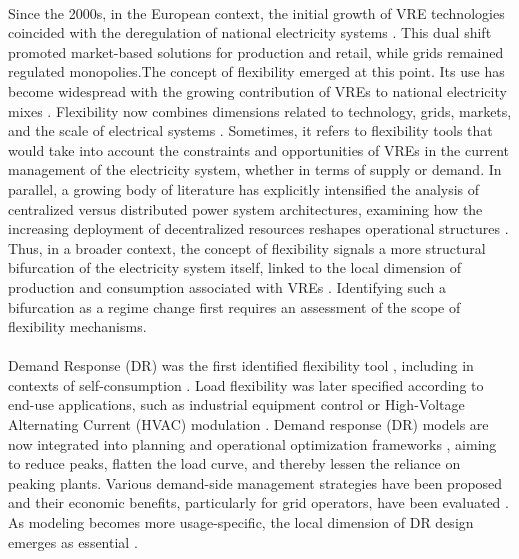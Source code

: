 \documentclass[12pt]{article}
\begin{document}
\paragraph{}
Since the 2000s, in the European context, the initial growth of VRE technologies coincided with the deregulation of national electricity systems \citep{nicolli2019liberalization}. This dual shift promoted market-based solutions for production and retail, while grids remained regulated monopolies.The concept of flexibility emerged at this point. Its use has become widespread with the growing contribution of VREs to national electricity mixes \citep{huber2014,lund2015}. Flexibility now combines dimensions related to technology, grids, markets, and the scale of electrical systems \citep{coudray2024}. Sometimes, it refers to flexibility tools that would take into account the constraints and opportunities of VREs in the current management of the electricity system, whether in terms of supply or demand. In parallel, a growing body of literature has explicitly intensified the analysis of centralized versus distributed power system architectures, examining how the increasing deployment of decentralized resources reshapes operational structures \citep{bouffard2008centralised,ulbig2015flexibility,jing2019distributed,stennikov2022coordinated}. Thus, in a broader context, the concept of flexibility signals a more structural bifurcation of the electricity system itself, linked to the local dimension of production and consumption associated with VREs \citep{chang2021trends}. Identifying such a bifurcation as a regime change first requires an assessment of the scope of flexibility mechanisms.

\paragraph{}
Demand Response (DR) was the first identified flexibility tool \citep{halvorsen2001,powells2014,bai2022}, including in contexts of self-consumption \citep{afzalan2019}. Load flexibility was later specified according to end-use applications, such as industrial equipment control or High-Voltage Alternating Current (HVAC) modulation \citep{liu2014}. Demand response (DR) models are now integrated into planning and operational optimization frameworks \citep{bai2022}, aiming to reduce peaks, flatten the load curve, and thereby lessen the reliance on peaking plants. Various demand-side management strategies have been proposed and their economic benefits, particularly for grid operators, have been evaluated \citep{oskouei2022}. As modeling becomes more usage-specific, the local dimension of DR design emerges as essential \citep{bai2022}.
\end{document}
